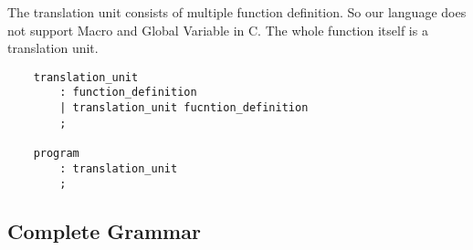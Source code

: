 The translation unit consists of multiple function definition. So our language does not support
Macro and Global Variable in C. The whole function itself is a translation unit.

\begin{verbatim}
    translation_unit
        : function_definition
        | translation_unit fucntion_definition
        ;

    program
        : translation_unit
        ;
\end{verbatim}

\subsection{Complete Grammar}


